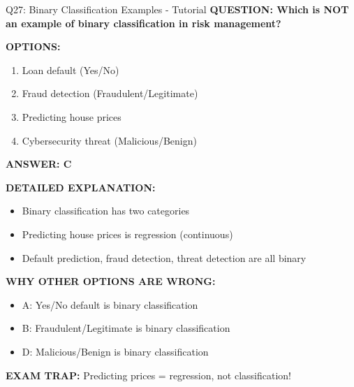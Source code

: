 \documentclass[8pt]{beamer}
\begin{document}
	\begin{frame}{Q27: Binary Classification Examples - Tutorial}
		\fontsize{6.5}{7.5}\selectfont
		\textbf{QUESTION: Which is NOT an example of binary classification in risk management?}
		
		\vspace{0.1cm}
		\textbf{OPTIONS:}
		\begin{enumerate}
			\item Loan default (Yes/No)
			\item Fraud detection (Fraudulent/Legitimate)
			\item Predicting house prices
			\item Cybersecurity threat (Malicious/Benign)
		\end{enumerate}
		
		\vspace{0.1cm}
		\textcolor{myblue}{\textbf{ANSWER: C}}
		
		\vspace{0.1cm}
		\textbf{DETAILED EXPLANATION:}
		\begin{itemize}
			\item Binary classification has two categories
			\item Predicting house prices is regression (continuous)
			\item Default prediction, fraud detection, threat detection are all binary
		\end{itemize}
		
		\vspace{0.1cm}
		\textcolor{myred}{\textbf{WHY OTHER OPTIONS ARE WRONG:}}
		\begin{itemize}
			\item \textcolor{myred}{A:} Yes/No default is binary classification
			\item \textcolor{myred}{B:} Fraudulent/Legitimate is binary classification
			\item \textcolor{myred}{D:} Malicious/Benign is binary classification
		\end{itemize}
		
		\textcolor{myred}{\textbf{EXAM TRAP:}} Predicting prices = \textcolor{myblue}{regression}, not classification!
	\end{frame}
	
\end{document}
